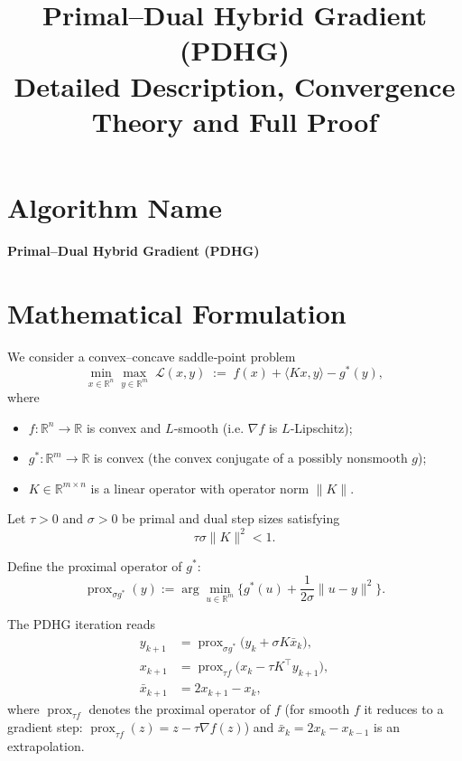 \documentclass{article}
\begin{document}
\title{Primal–Dual Hybrid Gradient (PDHG) \\ Detailed Description, Convergence Theory and Full Proof}
\author{}
\date{}
\maketitle

\tableofcontents

\newpage

\section*{Algorithm Name}
\begin{center}
\textbf{Primal–Dual Hybrid Gradient (PDHG)}
\end{center}
\section*{Mathematical Formulation}
We consider a convex–concave saddle‑point problem
\[
\min_{x\in\mathbb{R}^n}\max_{y\in\mathbb{R}^m}
\; \mathcal{L}(x,y)\;:=\;f(x)+\langle Kx,y\rangle-g^{*}(y),
\tag{1}
\]
where  

\begin{itemize}
\item $f:\mathbb{R}^n\to\mathbb{R}$ is convex and $L$‑smooth (i.e. $\nabla f$ is $L$‑Lipschitz);
\item $g^{*}:\mathbb{R}^m\to\mathbb{R}$ is convex (the convex conjugate of a possibly nonsmooth $g$);
\item $K\in\mathbb{R}^{m\times n}$ is a linear operator with operator norm $\|K\|$.
\end{itemize}

Let $\tau>0$ and $\sigma>0$ be primal and dual step sizes satisfying
\[
\tau\sigma\|K\|^{2}<1.
\tag{2}
\]

Define the proximal operator of $g^{*}$:
\[
\operatorname{prox}_{\sigma g^{*}}(y):=\arg\min_{u\in\mathbb{R}^m}
\Big\{g^{*}(u)+\frac{1}{2\sigma}\|u-y\|^{2}\Big\}.
\tag{3}
\]

The PDHG iteration reads
\[
\begin{aligned}
y_{k+1}&=\operatorname{prox}_{\sigma g^{*}}\!\big(y_{k}+\sigma K\bar{x}_{k}\big),\\[4pt]
x_{k+1}&=\operatorname{prox}_{\tau f}\!\big(x_{k}-\tau K^{\top} y_{k+1}\big),\\[4pt]
\bar{x}_{k+1}&=2x_{k+1}-x_{k},
\end{aligned}
\tag{4}
\]
where $\operatorname{prox}_{\tau f}$ denotes the proximal operator of $f$ (for smooth $f$ it reduces to a gradient step:
$\operatorname{prox}_{\tau f}(z)=z-\tau\nabla f(z)$) and $\bar{x}_{k}=2x_{k}-x_{k-1}$ is an extrapolation.
\end{document}

